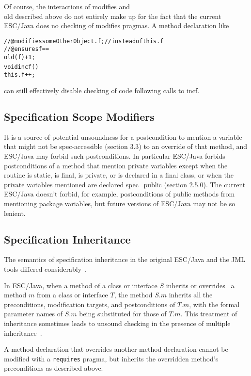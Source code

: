 \documentclass{acm_proc_article-sp}[10pt]
\begin{document}
Of course, the interactions of modifies and \\old described above do
not entirely make up for the fact that the current ESC/Java does no
checking of modifies pragmas.  A method declaration like
\begin{alltt}
    //@ modifies someOtherObject.f; //instead of this.f
    //@ ensures f == \\old(f) + 1;
    void incf() {
      this.f++;
    }
\end{alltt}
can still effectively disable checking of code following calls to incf.

\subsection{Specification Scope Modifiers}

It is a source of potential unsoundness for a postcondition to mention
a variable that might not be spec-accessible (section 3.3) to an
override of that method, and ESC/Java may forbid such postconditions.
In particular ESC/Java forbids postconditions of a method that mention
private variables except when the routine is static, is final, is
private, or is declared in a final class, or when the private
variables mentioned are declared spec\_public (section 2.5.0).  The
current ESC/Java doesn't forbid, for example, postconditions of public
methods from mentioning package variables, but future versions of
ESC/Java may not be so lenient.

\subsection{Specification Inheritance}

The semantics of specification inheritance in the original ESC/Java
and the JML tools differed considerably~\cite[Section
2.3]{ESCJavaUsersManual}.

In ESC/Java, when a method of a class or interface $S$ inherits or
overrides~\cite[8.4.6]{JLS2} a method $m$ from a class or interface
$T$, the method $S.m$ inherits all the preconditions, modification
targets, and postconditions of $T.m$, with the formal parameter names
of $S.m$ being substituted for those of $T.m$. This treatment of
inheritance sometimes leads to unsound checking in the presence of
multiple inheritance~\cite[Section C.0.5]{ESCJavaUsersManual}.

A method declaration that overrides another method declaration cannot
be modified with a \texttt{requires} pragma, but inherits the
overridden method's preconditions as described above.
\end{document}
